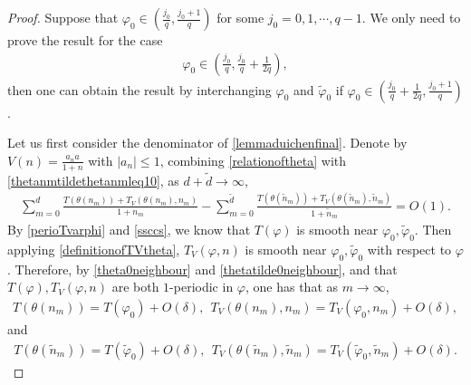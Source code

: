 \documentclass[12pt]{amsart}
\newcommand{\abs}[1]{\left\lvert #1 \right\rvert}
\theoremstyle{plain}
\theoremstyle{definition}
\begin{document}
	\begin{proof}
		Suppose that $\varphi_0\in \left(\frac{j_0}{q},\frac{j_0+1}{q}\right)$ for some $j_0=0,1,\cdots,q-1$. We only need to prove the result for the case 
		\begin{align}
			\varphi_0\in \left(\frac{j_0}{q},\frac{j_0}{q}+\frac{1}{2q}\right),\label{ficase}
		\end{align}
		then one can obtain the result by interchanging $\varphi_0$ and $\tilde{\varphi}_0$ if $\varphi_0\in \left(\frac{j_0}{q}+\frac{1}{2q},\frac{j_0+1}{q}\right)$.
		
			Let us first consider the denominator of \eqref{lemmaduichenfinal}. Denote by 
$V(n)=\frac{a_na}{1+n}$
		with $\abs{a_n}\leq 1$, combining \eqref{relationoftheta} with \eqref{thetanmtildethetanmleq10}, as $ d+{\tilde{d}}\to\infty$,
		\begin{align}
			\sum_{m=0}^{d}\frac{T(\theta(n_{m}))+T_V(\theta(n_{m}),n_{m})}{1+n_{m}}-\sum_{m=0}^{\tilde{d}}\frac{T(\theta(\tilde{n}_{m}))+T_V(\theta(\tilde{n}_{m}),\tilde{n}_{m})}{1+\tilde{n}_{m}}=O(1).\label{smallthanOvarepsilonsum}
		\end{align}
			By \eqref{perioTvarphi} and \eqref{ssccs}, we know that $T(\varphi)$ is smooth near $\varphi_0, \tilde{\varphi}_0$. Then applying \eqref{definitionofTVtheta}, $T_V(\varphi,n)$ is smooth near $\varphi_0,\tilde{\varphi}_0$  with respect to $\varphi$. Therefore, by
		\eqref{theta0neighbour} and \eqref{thetatilde0neighbour}, and that $T(\varphi),T_V(\varphi,n)$ are both $1$-periodic in $\varphi$, one has that as $m\to\infty$, 
		\begin{align}
			T(\theta(n_m))=T(\varphi_0)+O(\delta),\ \  T_V(\theta(n_m),n_m)=T_V(\varphi_0,n_m)+O(\delta),\nonumber
		\end{align}
		and
		\begin{align}
			T(\theta(\tilde{n}_m))=T(\tilde{\varphi}_0)+O(\delta),\ \  T_V(\theta(\tilde{n}_m),\tilde{n}_m)=T_V(\tilde{\varphi}_0,\tilde{n}_m)+O(\delta). \nonumber
		\end{align}

\end{proof}
\end{document}

